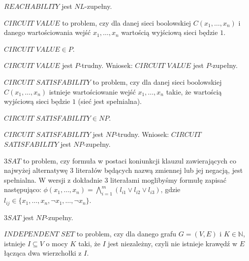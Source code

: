 \begin{twierdzenie}
    $REACHABILITY$ jest $NL$-zupełny.
\end{twierdzenie}

\begin{definicja}
    $CIRCUIT$ $VALUE$ to problem, czy dla danej sieci boolowskiej $C(x_1,\dots,x_n)$ i danego wartościowania wejść $x_1,\dots,x_n$ wartością wyjściową sieci będzie $1$.
\end{definicja}

\begin{lemat}
    $CIRCUIT$ $VALUE \in P$.
\end{lemat}

\begin{twierdzenie}
    $CIRCUIT$ $VALUE$ jest $P$-trudny. Wniosek: $CIRCUIT$ $VALUE$ jest $P$-zupełny.
\end{twierdzenie}

\begin{definicja}
    $CIRCUIT$ $SATISFABILITY$ to problem, czy dla danej sieci boolowskiej $C(x_1,\dots,x_n)$ istnieje wartościowanie wejść $x_1,\dots,x_n$ takie, że wartością wyjściową sieci będzie $1$ (sieć jest spełnialna).
\end{definicja}

\begin{lemat}
    $CIRCUIT$ $SATISFABILITY \in NP$.
\end{lemat}

\begin{twierdzenie}
    $CIRCUIT$ $SATISFABILITY$ jest $NP$-trudny. Wniosek: $CIRCUIT$ $SATISFABILITY$ jest $NP$-zupełny.
\end{twierdzenie}

\begin{definicja}
    $3SAT$ to problem, czy formuła w postaci koniunkcji klauzul zawierających co najwyżej alternatywę 3 literałów będących nazwą zmiennej lub jej negacją, jest spełnialna. W wersji z dokładnie 3 literałami moglibyśmy formułę zapisać następująco: $\phi(x_1,\dots,x_n) = \bigwedge_{i = 1}^{m} (l_{i1} \lor l_{i2} \lor l_{i3})$, gdzie $l_{ij} \in \{x_1,\dots,x_n, \neg x_1,\dots, \neg x_n\}$.
\end{definicja}

\begin{twierdzenie}
    $3SAT$ jest $NP$-zupełny.
\end{twierdzenie}

\begin{definicja}
    $INDEPENDENT$ $SET$ to problem, czy dla danego grafu $G = (V, E)$ i $K \in \mathbb{N}$, istnieje $I \subseteq V$ o mocy $K$ taki, że $I$ jest niezależny, czyli nie istnieje krawędź w $E$ łącząca dwa wierzchołki z $I$.
\end{definicja}

